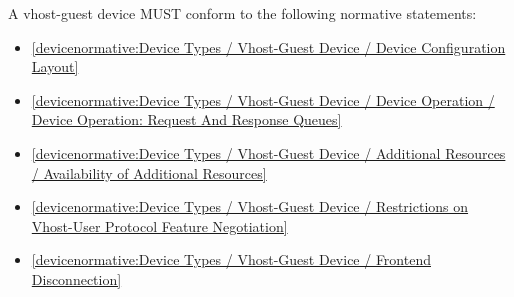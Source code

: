 \label{sec:Conformance / Device Conformance / Vhost-Guest Device Conformance}

A vhost-guest device MUST conform to the following normative statements:

\begin{itemize}
\item \ref{devicenormative:Device Types / Vhost-Guest Device / Device Configuration Layout}
\item \ref{devicenormative:Device Types / Vhost-Guest Device / Device Operation / Device Operation: Request And Response Queues}
\item \ref{devicenormative:Device Types / Vhost-Guest Device / Additional Resources / Availability of Additional Resources}
\item \ref{devicenormative:Device Types / Vhost-Guest Device / Restrictions on Vhost-User Protocol Feature Negotiation}
\item \ref{devicenormative:Device Types / Vhost-Guest Device / Frontend Disconnection}
\end{itemize}
